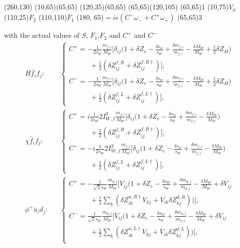 \begin{axopicture}(260,130) %
	\Line[dash](10,65)(65,65)
	\Line[arrow](120,35)(65,65)
	\Line[arrow](65,65)(120,105)
	\Vertex(65,65){1}		
	\Text(10,75){$V_\mu$}
	\Text(110,25){$F_2$}
	\Text(110,110){$\bar{F}_1$}
	\Text(180, 65){$=ie(C^-\omega_-+C^+\omega_+)$}
	\Vertex(65,65){3}
\end{axopicture}
\newline with the actual values of $S$, $\bar{F}_1$,$F_2$ and $C^+$ and $C^-$
\begin{eqnarray*}
	H\bar{f}_if_j:&&\begin{cases}
		C^+=-\frac{1}{2s_W}\frac{m_{f,i}}{M_W}\biggl[ \delta_{ij}\biggl(  1+\delta Z_e-\frac{\delta s_w}{s_W}+\frac{\delta m_{f,i}}{m_{f,i}}-\frac{\delta M_W}{M_W}+\frac{1}{2}\delta Z_H \biggr)\\
		\quad\quad\quad+\frac{1}{2}(\delta Z^{f,R}_{ij}+\delta Z^{f,R\dagger}_{ij}) \biggr],\\
		C^-=-\frac{1}{2s_W}\frac{m_{f,i}}{M_W}\biggl[ \delta_{ij}\biggl(  1+\delta Z_e-\frac{\delta s_w}{s_W}+\frac{\delta m_{f,i}}{m_{f,i}}-\frac{\delta M_W}{M_W}+\frac{1}{2}\delta Z_H \biggr)\\
		\quad\quad\quad+\frac{1}{2}(\delta Z^{f,L}_{ij}+\delta Z^{f,L\dagger}_{ij}) \biggr],
	\end{cases}\nonumber\\
	\chi\bar{f}_if_j:&&\begin{cases}
		C^+=i\frac{1}{2s_W}2I^3_{W,f}\frac{m_{f,i}}{M_W}\biggl[ \delta_{ij}\biggl(  1+\delta Z_e-\frac{\delta s_w}{s_W}+\frac{\delta m_{f,i}}{m_{f,i}}-\frac{\delta M_W}{M_W} \biggr)\\
		\quad\quad\quad+\frac{1}{2}(\delta Z^{f,R}_{ij}+\delta Z^{f,R\dagger}_{ij}) \biggr],\\
		C^-=-i\frac{1}{2s_W}2I^3_{W,f}\frac{m_{f,i}}{M_W}\biggl[ \delta_{ij}\biggl(  1+\delta Z_e-\frac{\delta s_w}{s_W}+\frac{\delta m_{f,i}}{m_{f,i}}-\frac{\delta M_W}{M_W} \biggr)\\
		\quad\quad\quad+\frac{1}{2}(\delta Z^{f,L}_{ij}+\delta Z^{f,L\dagger}_{ij}) \biggr],
	\end{cases}\nonumber\\
	\phi^+\bar{u}_id_j:&&
	\begin{cases}
		C^+=-\frac{1}{\sqrt{2}s_W}\frac{m_{d,j}}{M_W}\biggl[ V_{ij}\biggl( 1+\delta Z_e-\frac{\delta s_W}{s_W}+\frac{\delta m_{d,j}}{m_{d,j}}-\frac{\delta M_W}{M_W}+\delta V_{ij}\\
		\quad\quad\quad +\frac{1}{2}\sum_k(\delta Z^{u,R\dagger}_{ik}V_{kj}+V_{ik}\delta Z^{d,R}_{kj}) \biggr) \biggr],\\
		C^-=\frac{1}{\sqrt{2}s_W}\frac{m_{u,j}}{M_W}\biggl[ V_{ij}\biggl( 1+\delta Z_e-\frac{\delta s_W}{s_W}+\frac{\delta m_{u,j}}{m_{u,j}}-\frac{\delta M_W}{M_W}+\delta V_{ij}\\
		\quad\quad\quad +\frac{1}{2}\sum_k(\delta Z^{u,L\dagger}_{ik}V_{kj}+V_{ik}\delta Z^{d,L}_{kj}) \biggr) \biggr],\\
	\end{cases}\nonumber\\
\end{eqnarray*}
